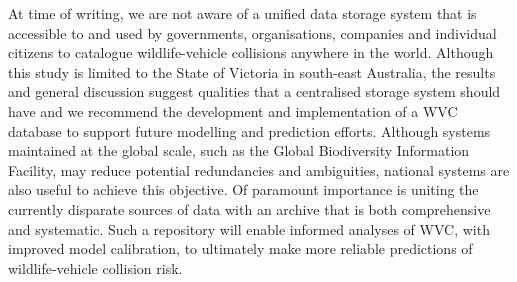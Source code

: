 At time of writing, we are not aware of a unified data storage system that is accessible to and used by governments, organisations, companies and individual citizens to catalogue wildlife-vehicle collisions anywhere in the world. Although this study is limited to the State of Victoria in south-east Australia, the results and general discussion suggest qualities that a centralised storage system should have and we recommend the development and implementation of a WVC database to support future modelling and prediction efforts. Although systems maintained at the global scale, such as the Global Biodiversity Information Facility, may reduce potential redundancies and ambiguities, national systems are also useful to achieve this objective. Of paramount importance is uniting the currently disparate sources of data with an archive that is both comprehensive and systematic. Such a repository will enable informed analyses of WVC, with improved model calibration, to ultimately make more reliable predictions of wildlife-vehicle collision risk. 

